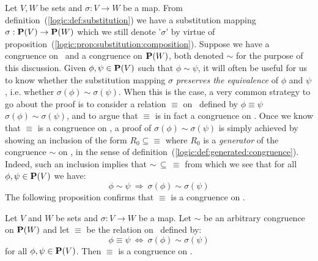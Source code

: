 Let $V,W$ be sets and $\sigma:V\to W$ be a map. From
definition~(\ref{logic:def:substitution}) we have a substitution
mapping $\sigma:\mbox{${\bf P}(V)$}\to{\bf P}(W)$ which we still denote '$\sigma$'
by virtue of
proposition~(\ref{logic:prop:substitution:composition}). Suppose we
have a congruence on \pv\ and a congruence on ${\bf P}(W)$, both
denoted $\sim$ for the purpose of this discussion. Given
$\phi,\psi\in\mbox{${\bf P}(V)$}$ such that $\phi\sim\psi$, it will often be useful
for us to know whether the substitution mapping $\sigma$ {\em
preserves the equivalence} of $\phi$ and $\psi$, i.e. whether
$\sigma(\phi)\sim\sigma(\psi)$. When this is the case, a very common
strategy to go about the proof is to consider a relation $\equiv$ on
\pv\ defined by $\phi\equiv\psi$ \ifand\
$\sigma(\phi)\sim\sigma(\psi)$, and to argue that $\equiv$ is in
fact a congruence on \pv. Once we know that $\equiv$ is a congruence
on \pv, a proof of $\sigma(\phi)\sim\sigma(\psi)$ is simply achieved
by showing an inclusion of the form $R_{0}\subseteq\equiv$ where
$R_{0}$ is a {\em generator} of the congruence $\sim$ on \pv, in the
sense of definition~(\ref{logic:def:generated:congruence}). Indeed,
such an inclusion implies that $\sim\,\subseteq\,\equiv$ from which
we see that for all $\phi,\psi\in\mbox{${\bf P}(V)$}$ we have:
    \[
    \phi\sim\psi\ \Rightarrow\ \sigma(\phi)\sim\sigma(\psi)
    \]
The following proposition confirms that $\equiv$ is a congruence on
\pv.
\begin{prop}\label{logic:prop:substitution:congruence}
    Let $V$ and $W$ be sets and $\sigma:V\to W$ be a map. Let $\sim$ be
    an arbitrary congruence on ${\bf P}(W)$ and let $\equiv$ be the
    relation on \pv\ defined by:
    \[
        \phi\equiv\psi\ \Leftrightarrow\ \sigma(\phi)\sim\sigma(\psi)
    \]
    for all $\phi,\psi\in\mbox{${\bf P}(V)$}$. Then $\equiv$ is a congruence on \pv.
\end{prop}

